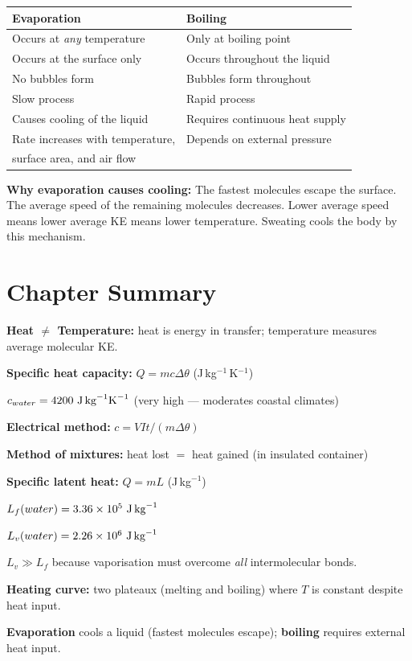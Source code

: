 \begin{defbox}
\begin{center}
\begin{tabular}{ll}
\toprule
\textbf{Evaporation} & \textbf{Boiling}\\
\midrule
Occurs at \textit{any} temperature & Only at boiling point\\
Occurs at the surface only & Occurs throughout the liquid\\
No bubbles form & Bubbles form throughout\\
Slow process & Rapid process\\
Causes cooling of the liquid & Requires continuous heat supply\\
Rate increases with temperature, & Depends on external pressure\\
surface area, and air flow & \\
\bottomrule
\end{tabular}
\end{center}
\vspace{0.3cm}
\textbf{Why evaporation causes cooling:}
The fastest molecules escape the surface. The average
speed of the remaining molecules decreases. Lower
average speed means lower average KE means lower
temperature. Sweating cools the body by this mechanism.
\end{defbox}

\section{Chapter Summary}

\begin{summarybox}
\textbf{Heat $\neq$ Temperature:} heat is energy in
transfer; temperature measures average molecular KE.

\textbf{Specific heat capacity:}
$Q = mc\Delta\theta$
(J\,kg$^{-1}$\,K$^{-1}$)

$c_{water} = 4200\ \text{J\,kg}^{-1}\text{K}^{-1}$
(very high --- moderates coastal climates)

\textbf{Electrical method:}
$c = VIt/(m\Delta\theta)$

\textbf{Method of mixtures:}
heat lost $=$ heat gained (in insulated container)

\textbf{Specific latent heat:}
$Q = mL$ (J\,kg$^{-1}$)

$L_f(water) = 3.36\times10^5\ \text{J\,kg}^{-1}$

$L_v(water) = 2.26\times10^6\ \text{J\,kg}^{-1}$

$L_v \gg L_f$ because vaporisation must overcome
\textit{all} intermolecular bonds.

\textbf{Heating curve:} two plateaux (melting and
boiling) where $T$ is constant despite heat input.

\textbf{Evaporation} cools a liquid (fastest
molecules escape); \textbf{boiling} requires
external heat input.
\end{summarybox}

